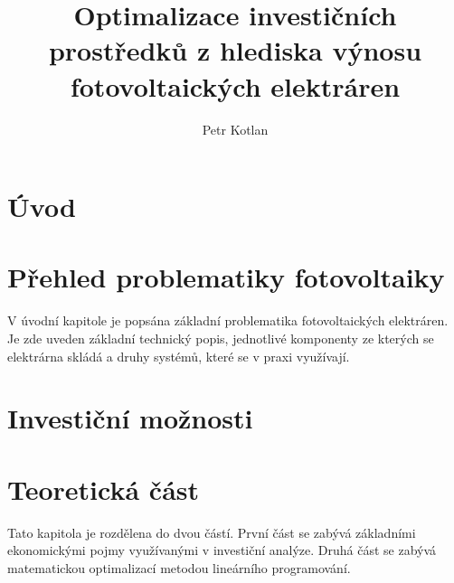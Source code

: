 \documentclass[a4paper, 12pt]{report}
\author{Petr Kotlan}
\title{Optimalizace investičních prostředků z hlediska výnosu fotovoltaických elektráren}
\date{}
\begin{document}

\thispagestyle{empty}
\mbox{}




\thispagestyle{empty}
\mbox{}
\newpage



\thispagestyle{empty}
\mbox{}
\newpage



\thispagestyle{empty}
\mbox{}
\newpage

\tableofcontents

\renewcommand{\chaptername}{Úvod}
\chapter*{Úvod}

\chapter{Přehled problematiky fotovoltaiky}
\renewcommand{\chaptername}{Přehled problematiky fotovoltaiky}

V úvodní kapitole je popsána základní problematika fotovoltaických elektráren.
Je zde uveden základní technický popis, jednotlivé komponenty ze kterých se elektrárna skládá a druhy systémů, které se v praxi využívají.



\chapter{Investiční možnosti}
\renewcommand{\chaptername}{Investiční možnosti}

\chapter{Teoretická část}
\renewcommand{\chaptername}{Teoretická část}

Tato kapitola je rozdělena do dvou částí. První část se zabývá základními ekonomickými pojmy využívanými v investiční analýze.
Druhá část se zabývá matematickou optimalizací metodou lineárního programování.


\end{document}
